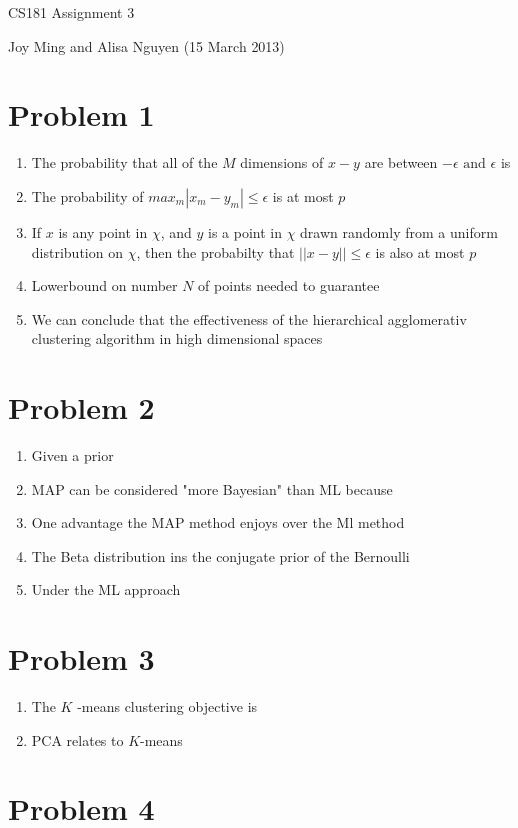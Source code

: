 \documentclass[11pt]{article}
\begin{document}
\begin{center}
\large
CS181 Assignment 3
\end{center}
Joy Ming and Alisa Nguyen (15 March 2013)\\

\section{Problem 1}
\begin{enumerate}
\item The probability that all of the $M$ dimensions of $x - y$ are between $-\epsilon \text{ and } \epsilon$ is
\item The probability of $max_m |x_m - y_m| \leq \epsilon$ is at most $p$
\item If $x$ is any point in $\chi$, and $y$ is a point in $\chi$ drawn randomly from a uniform distribution on $\chi$, then the probabilty that $||x - y|| \leq \epsilon$ is also at most $p$
\item Lowerbound on number $N$ of points needed to guarantee
\item We can conclude that the effectiveness of the hierarchical agglomerativ clustering algorithm in high dimensional spaces
\end{enumerate}

\section{Problem 2}
\begin{enumerate}
\item Given a prior
\item MAP can be considered "more Bayesian" than ML because
\item One advantage the MAP method enjoys over the Ml method
\item The Beta distribution ins the conjugate prior of the Bernoulli
\item Under the ML approach
\end{enumerate}

\section{Problem 3}
\begin{enumerate}
\item The $K$ -means clustering objective is
\item PCA relates to $K$-means
\end{enumerate}

\section{Problem 4}
\end{document}
